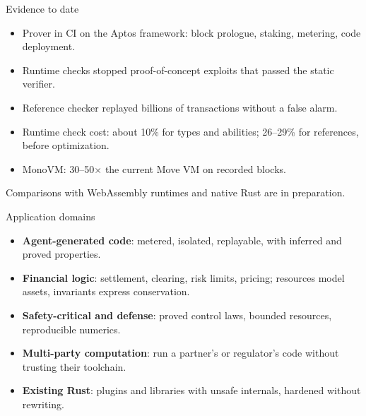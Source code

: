 \documentclass[aspectratio=169,11pt]{beamer}
\begin{document}
\begin{frame}{Evidence to date}
  \begin{itemize}\setlength{\itemsep}{6pt}
    \item Prover in CI on the Aptos framework: block prologue, staking, metering, code deployment.
    \item Runtime checks stopped proof-of-concept exploits that passed the static verifier.
    \item Reference checker replayed billions of transactions without a false alarm.
    \item Runtime check cost: about 10\% for types and abilities; 26--29\% for references, before optimization.
    \item MonoVM: 30--50$\times$ the current Move VM on recorded blocks.
  \end{itemize}
  \medskip
  Comparisons with WebAssembly runtimes and native Rust are in preparation.
\end{frame}

\begin{frame}{Application domains}
  \begin{itemize}\setlength{\itemsep}{3pt}
    \item \textbf{Agent-generated code}: metered, isolated, replayable, with inferred and proved properties.
    \item \textbf{Financial logic}: settlement, clearing, risk limits, pricing; resources model assets, invariants express conservation.
    \item \textbf{Safety-critical and defense}: proved control laws, bounded resources, reproducible numerics.
    \item \textbf{Multi-party computation}: run a partner's or regulator's code without trusting their toolchain.
    \item \textbf{Existing Rust}: plugins and libraries with unsafe internals, hardened without rewriting.
  \end{itemize}
\end{frame}
\end{document}
